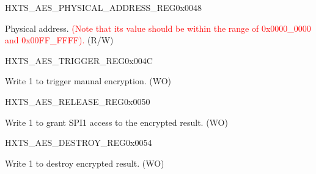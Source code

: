 \begin{register}{H}{XTS\_AES\_PHYSICAL\_ADDRESS\_REG}{0x0048}\label{regdesc:XTSAESPHYSICALADDRESSREG}
%
%
\regnewline%
\begin{regdesc}\begin{reglist}
\item [XTS\_AES\_PHYSICAL\_ADDRESS] Physical address. \textcolor{red}{(Note that its value should be within the range of 0x0000\_0000 and 0x00FF\_FFFF).}  (R/W)
\end{reglist}\end{regdesc}
\end{register}

\begin{register}{H}{XTS\_AES\_TRIGGER\_REG}{0x004C}\label{regdesc:XTSAESTRIGGERREG}
%
%
\regnewline%
\begin{regdesc}\begin{reglist}
\item [XTS\_AES\_TRIGGER] Write 1 to trigger maunal encryption. (WO)
\end{reglist}\end{regdesc}
\end{register}
\begin{register}{H}{XTS\_AES\_RELEASE\_REG}{0x0050}\label{regdesc:XTSAESRELEASEREG}
%
%
\regnewline%
\begin{regdesc}\begin{reglist}
\item [XTS\_AES\_RELEASE] Write 1 to grant SPI1 access to the encrypted result. (WO)
\end{reglist}\end{regdesc}
\end{register}

\begin{register}{H}{XTS\_AES\_DESTROY\_REG}{0x0054}\label{regdesc:XTSAESDESTROYREG}
%
%
\regnewline%
\begin{regdesc}\begin{reglist}
\item [XTS\_AES\_DESTROY] Write 1 to destroy encrypted result. (WO)
\end{reglist}\end{regdesc}
\end{register}


